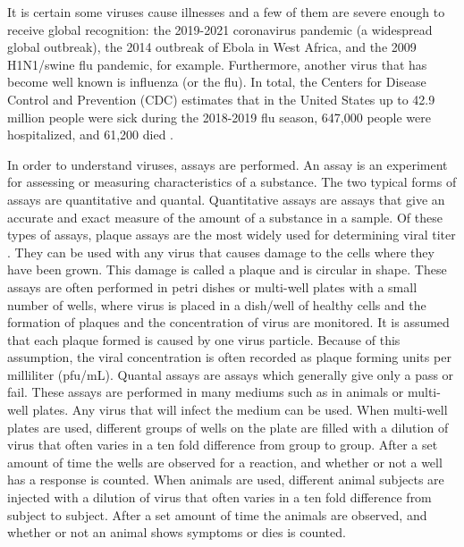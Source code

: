 It is certain some viruses cause illnesses and a few of them are severe enough to receive global recognition: the 2019-2021 coronavirus pandemic (a widespread global outbreak), the 2014 outbreak of Ebola in West Africa, and the 2009 H1N1/swine flu pandemic, for example. Furthermore, another virus that has become well known is influenza (or the flu). In total, the Centers for Disease Control and Prevention (CDC) estimates that in the United States up to 42.9 million people were sick during the 2018-2019 flu season, 647,000 people were hospitalized, and 61,200 died \cite{website4}.

In order to understand viruses, assays are performed. An assay is an experiment for assessing or measuring characteristics of a substance. The two typical forms of assays are quantitative and quantal. Quantitative assays are assays that give an accurate and exact measure of the amount of a substance in a sample. Of these types of assays, plaque assays are the most widely used for determining viral titer \cite{Kumar}. They can be used with any virus that causes damage to the cells where they have been grown. This damage is called a plaque and is circular in shape. These assays are often performed in petri dishes or multi-well plates with a small number of wells, where virus is placed in a dish/well of healthy cells and the formation of plaques and the concentration of virus are monitored. It is assumed that each plaque formed is caused by one virus particle. Because of this assumption, the viral concentration is often recorded as plaque forming units per milliliter (pfu/mL). Quantal assays are assays which generally give only a pass or fail. These assays are performed in many mediums such as in animals or multi-well plates. Any virus that will infect the medium can be used. When multi-well plates are used, different groups of wells on the plate are filled with a dilution of virus that often varies in a ten fold difference from group to group. After a set amount of time the wells are observed for a reaction, and whether or not a well has a response is counted. When animals are used, different animal subjects are injected with a dilution of virus that often varies in a ten fold difference from subject to subject. After a set amount of time the animals are observed, and whether or not an animal shows symptoms or dies is counted.


